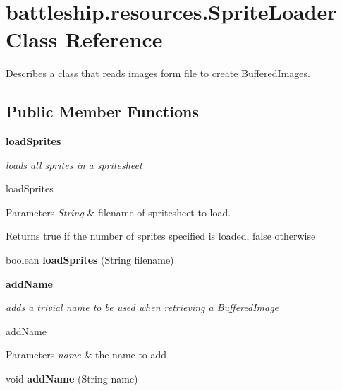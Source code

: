 \hypertarget{classbattleship_1_1resources_1_1SpriteLoader}{}\section{battleship.\+resources.\+Sprite\+Loader Class Reference}
\label{classbattleship_1_1resources_1_1SpriteLoader}


Describes a class that reads images form file to create Buffered\+Images.  


\subsection*{Public Member Functions}
\begin{Indent}{\bf load\+Sprites}\par
{\em loads all sprites in a spritesheet

load\+Sprites


\begin{DoxyParams}{Parameters}
{\em String} & filename of spritesheet to load. \\
\hline
\end{DoxyParams}
\begin{DoxyReturn}{Returns}
true if the number of sprites specified is loaded, false otherwise 
\end{DoxyReturn}
}\begin{DoxyCompactItemize}
\item 
\hypertarget{classbattleship_1_1resources_1_1SpriteLoader_a13b5ec4502866cca8078d3099d145f68}{}boolean {\bfseries load\+Sprites} (String filename)\label{classbattleship_1_1resources_1_1SpriteLoader_a13b5ec4502866cca8078d3099d145f68}

\end{DoxyCompactItemize}
\end{Indent}
\begin{Indent}{\bf add\+Name}\par
{\em adds a trivial name to be used when retrieving a Buffered\+Image

add\+Name


\begin{DoxyParams}{Parameters}
{\em name} & the name to add \\
\hline
\end{DoxyParams}
}\begin{DoxyCompactItemize}
\item 
\hypertarget{classbattleship_1_1resources_1_1SpriteLoader_a395be774e574e354dbd05f1d99f0f03a}{}void {\bfseries add\+Name} (String name)\label{classbattleship_1_1resources_1_1SpriteLoader_a395be774e574e354dbd05f1d99f0f03a}

\end{DoxyCompactItemize}
\end{Indent}
